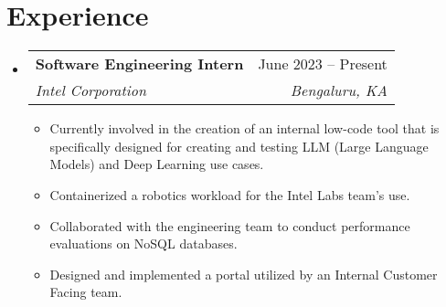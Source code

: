 \documentclass[letterpaper,11pt]{article}
\makeatletter
\newcommand{\resumeItem}[1]{
  \item\small{
    {#1 \vspace{-2pt}}
  }
}
\newcommand{\resumeSubheading}[4]{
  \vspace{-2pt}\item
    \begin{tabular*}{0.97\textwidth}[t]{l@{\extracolsep{\fill}}r}
      \textbf{#1} & #2 \\
      \textit{\small#3} & \textit{\small #4} \\
    \end{tabular*}\vspace{-7pt}
}
\newcommand{\resumeSubSubheading}[2]{
    \item
    \begin{tabular*}{0.97\textwidth}{l@{\extracolsep{\fill}}r}
      \textit{\small#1} & \textit{\small #2} \\
    \end{tabular*}\vspace{-7pt}
}
\newcommand{\resumeSubHeadingListStart}{\begin{itemize}[leftmargin=0.15in, label={}]}
\newcommand{\resumeSubHeadingListEnd}{\end{itemize}}
\newcommand{\resumeItemListStart}{\begin{itemize}}
\newcommand{\resumeItemListEnd}{\end{itemize}\vspace{-5pt}}
\makeatother
\begin{document}
\section{Experience}
  \resumeSubHeadingListStart

    \resumeSubheading
      {Software Engineering Intern}{June 2023 -- Present}
      {Intel Corporation}{Bengaluru, KA}
      \resumeItemListStart
        \resumeItem{Currently involved in the creation of an internal low-code tool that is specifically designed for creating and testing LLM (Large Language Models) and Deep Learning use cases.}
        \resumeItem{Containerized a robotics workload for the Intel Labs team's use.}
        \resumeItem{Collaborated with the engineering team to conduct performance evaluations on NoSQL databases.}
        \resumeItem{Designed and implemented a portal utilized by an Internal Customer Facing team.}
      \resumeItemListEnd



   \resumeSubHeadingListEnd
%
\end{document}
